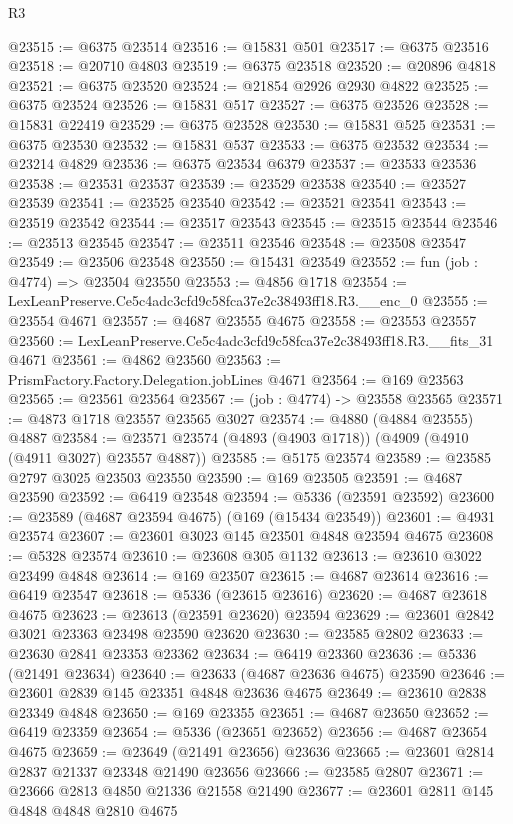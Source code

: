 \begin{lexlean}{R3}
\begin{coremodule}
@23515 := @6375 @23514
@23516 := @15831 @501
@23517 := @6375 @23516
@23518 := @20710 @4803
@23519 := @6375 @23518
@23520 := @20896 @4818
@23521 := @6375 @23520
@23524 := @21854 @2926 @2930 @4822
@23525 := @6375 @23524
@23526 := @15831 @517
@23527 := @6375 @23526
@23528 := @15831 @22419
@23529 := @6375 @23528
@23530 := @15831 @525
@23531 := @6375 @23530
@23532 := @15831 @537
@23533 := @6375 @23532
@23534 := @23214 @4829
@23536 := @6375 @23534 @6379
@23537 := @23533 @23536
@23538 := @23531 @23537
@23539 := @23529 @23538
@23540 := @23527 @23539
@23541 := @23525 @23540
@23542 := @23521 @23541
@23543 := @23519 @23542
@23544 := @23517 @23543
@23545 := @23515 @23544
@23546 := @23513 @23545
@23547 := @23511 @23546
@23548 := @23508 @23547
@23549 := @23506 @23548
@23550 := @15431 @23549
@23552 := fun (job : @4774) => @23504 @23550
@23553 := @4856 @1718
@23554 := LexLeanPreserve.Ce5c4adc3cfd9c58fca37e2c38493ff18.R3.__enc_0
@23555 := @23554 @4671
@23557 := @4687 @23555 @4675
@23558 := @23553 @23557
@23560 := LexLeanPreserve.Ce5c4adc3cfd9c58fca37e2c38493ff18.R3.__fits_31 @4671
@23561 := @4862 @23560
@23563 := PrismFactory.Factory.Delegation.jobLines @4671
@23564 := @169 @23563
@23565 := @23561 @23564
@23567 := (job : @4774) -> @23558 @23565
@23571 := @4873 @1718 @23557 @23565 @3027
@23574 := @4880 (@4884 @23555) @4887
@23584 := @23571 @23574 (@4893 (@4903 @1718)) (@4909 (@4910 (@4911 @3027) @23557 @4887))
@23585 := @5175 @23574
@23589 := @23585 @2797 @3025 @23503 @23550
@23590 := @169 @23505
@23591 := @4687 @23590
@23592 := @6419 @23548
@23594 := @5336 (@23591 @23592)
@23600 := @23589 (@4687 @23594 @4675) (@169 (@15434 @23549))
@23601 := @4931 @23574
@23607 := @23601 @3023 @145 @23501 @4848 @23594 @4675
@23608 := @5328 @23574
@23610 := @23608 @305 @1132
@23613 := @23610 @3022 @23499 @4848
@23614 := @169 @23507
@23615 := @4687 @23614
@23616 := @6419 @23547
@23618 := @5336 (@23615 @23616)
@23620 := @4687 @23618 @4675
@23623 := @23613 (@23591 @23620) @23594
@23629 := @23601 @2842 @3021 @23363 @23498 @23590 @23620
@23630 := @23585 @2802
@23633 := @23630 @2841 @23353 @23362
@23634 := @6419 @23360
@23636 := @5336 (@21491 @23634)
@23640 := @23633 (@4687 @23636 @4675) @23590
@23646 := @23601 @2839 @145 @23351 @4848 @23636 @4675
@23649 := @23610 @2838 @23349 @4848
@23650 := @169 @23355
@23651 := @4687 @23650
@23652 := @6419 @23359
@23654 := @5336 (@23651 @23652)
@23656 := @4687 @23654 @4675
@23659 := @23649 (@21491 @23656) @23636
@23665 := @23601 @2814 @2837 @21337 @23348 @21490 @23656
@23666 := @23585 @2807
@23671 := @23666 @2813 @4850 @21336 @21558 @21490
@23677 := @23601 @2811 @145 @4848 @4848 @2810 @4675

\end{coremodule}
\end{lexlean}
